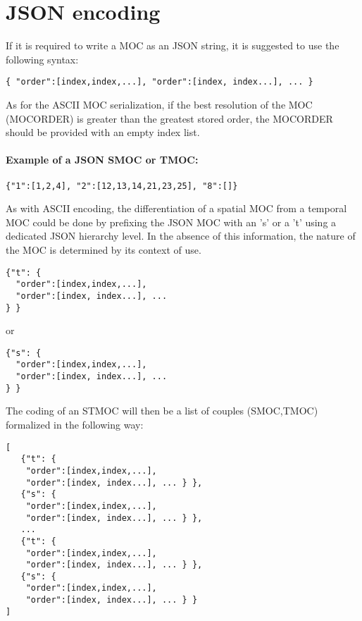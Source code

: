 \section{JSON encoding}
If it is required to write a MOC as an JSON string,
it is suggested to use the following syntax:

\par\noindent
\begin{lstlisting}[]
   { "order":[index,index,...], "order":[index, index...], ... }
\end{lstlisting}

As for the ASCII MOC serialization, if the best resolution
of the MOC (MOCORDER) is greater than the greatest stored order, the
MOCORDER should be provided with an empty index list.

\paragraph{Example of a JSON SMOC or TMOC:}
\par\noindent
\begin{lstlisting}[]
    {"1":[1,2,4], "2":[12,13,14,21,23,25], "8":[]}
\end{lstlisting}

As with ASCII encoding, the differentiation of a spatial MOC from a temporal MOC could be done by prefixing the JSON MOC with an 's' or a 't' using a dedicated JSON hierarchy level. In the absence of this information, the nature of the MOC is determined by its context of use.

\begin{lstlisting}[]
{"t": {
  "order":[index,index,...],
  "order":[index, index...], ...
} }
\end{lstlisting}

or

\begin{lstlisting}[]
{"s": {
  "order":[index,index,...],
  "order":[index, index...], ...
} }
\end{lstlisting}


The coding of an STMOC will then be a list of couples (SMOC,TMOC) formalized in the following way:

\begin{lstlisting}[]
[
   {"t": {
    "order":[index,index,...],
    "order":[index, index...], ... } },
   {"s": {
    "order":[index,index,...],
    "order":[index, index...], ... } },
   ...
   {"t": {
    "order":[index,index,...],
    "order":[index, index...], ... } },
   {"s": {
    "order":[index,index,...],
    "order":[index, index...], ... } }
]
\end{lstlisting}

